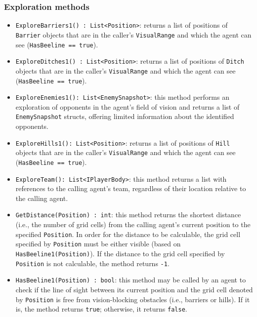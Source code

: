 \documentclass[
    a4paper,
    english,
    DIV=16,
    11pt,
    parskip=half,
    listof=totoc,		%
    index=totoc,		%
    bibliography=totoc,	%
]{scrartcl}
\begin{document}
\subsubsection{Exploration methods}

\begin{itemize}
    \item \texttt{ExploreBarriers1() : List<Position>}: returns a list of positions of \texttt{Barrier} objects that are in the caller's \texttt{VisualRange} and which the agent can see (\texttt{HasBeeline == true}).
    \item \texttt{ExploreDitches1() : List<Position>}: returns a list of positions of \texttt{Ditch} objects that are in the caller's \texttt{VisualRange} and which the agent can see (\texttt{HasBeeline == true}).
    \item \texttt{ExploreEnemies1(): List<EnemySnapshot>}: this method performs an exploration of opponents in the agent's field of vision and returns a list of \texttt{EnemySnapshot} structs, offering limited information about the identified opponents. 
    \item \texttt{ExploreHills1(): List<Position>}: returns a list of positions of \texttt{Hill} objects that are in the caller's \texttt{VisualRange} and which the agent can see (\texttt{HasBeeline == true}).
    \item \texttt{ExploreTeam(): List<IPlayerBody>}: this method returns a list with references to the calling agent's team, regardless of their location relative to the calling agent.
    \item \texttt{GetDistance(Position) : int}: this method returns the shortest distance (i.e., the number of grid cells) from the calling agent's current position to the specified \texttt{Position}. In order for the distance to be calculable, the grid cell specified by \texttt{Position} must be either visible (based on \texttt{HasBeeline1(Position)}). If the distance to the grid cell specified by \texttt{Position} is not calculable, the method returns \texttt{-1}.
    \item \texttt{HasBeeline1(Position) : bool}: this method may be called by an agent to check if the line of sight between its current position and the grid cell denoted by \texttt{Position} is free from vision-blocking obstacles (i.e., barriers or hills). If it is, the method returns \texttt{true}; otherwise, it returns \texttt{false}.
\end{itemize}
\end{document}
